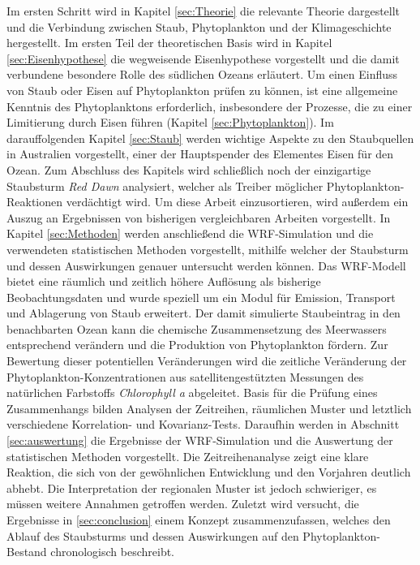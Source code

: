 \documentclass[12pt,a4paper,onecolumn,headheight=30pt]{scrartcl}
\begin{document}
Im ersten Schritt wird in Kapitel \ref{sec:Theorie} die relevante Theorie dargestellt und die Verbindung zwischen Staub, Phytoplankton und der Klimageschichte hergestellt. Im ersten Teil der theoretischen Basis wird in Kapitel \ref{sec:Eisenhypothese} die wegweisende Eisenhypothese \citep{Martin.1990} vorgestellt und die damit verbundene besondere Rolle des südlichen Ozeans erläutert. Um einen Einfluss von Staub oder Eisen auf Phytoplankton prüfen zu können, ist eine allgemeine Kenntnis des Phytoplanktons erforderlich, insbesondere der Prozesse, die zu einer Limitierung durch Eisen führen (Kapitel \ref{sec:Phytoplankton}). Im darauffolgenden Kapitel \ref{sec:Staub} werden wichtige Aspekte zu den Staubquellen in Australien vorgestellt, einer der Hauptspender des Elementes Eisen für den Ozean. Zum Abschluss des Kapitels wird schließlich noch der einzigartige Staubsturm \textit{Red Dawn} analysiert, welcher als Treiber möglicher Phytoplankton-Reaktionen verdächtigt wird. Um diese Arbeit einzusortieren, wird außerdem ein Auszug an Ergebnissen von bisherigen vergleichbaren Arbeiten vorgestellt. In Kapitel \ref{sec:Methoden} werden anschließend die WRF-Simulation und die verwendeten statistischen Methoden vorgestellt, mithilfe welcher der Staubsturm und dessen Auswirkungen genauer untersucht werden können. Das WRF-Modell bietet eine räumlich und zeitlich höhere Auflösung als bisherige Beobachtungsdaten und wurde speziell um ein Modul für Emission, Transport und Ablagerung von Staub erweitert. Der damit simulierte Staubeintrag in den benachbarten Ozean kann die chemische Zusammensetzung des Meerwassers entsprechend verändern und die Produktion von Phytoplankton fördern. Zur Bewertung dieser potentiellen Veränderungen wird die zeitliche Veränderung der Phytoplankton-Konzentrationen aus satellitengestützten Messungen des natürlichen Farbstoffs \textit{Chlorophyll a} abgeleitet. Basis für die Prüfung eines Zusammenhangs bilden Analysen der Zeitreihen, räumlichen Muster und letztlich verschiedene Korrelation- und Kovarianz-Tests. Daraufhin werden in Abschnitt \ref{sec:auswertung} die Ergebnisse der WRF-Simulation und die Auswertung der statistischen Methoden vorgestellt. Die Zeitreihenanalyse zeigt eine klare Reaktion, die sich von der gewöhnlichen Entwicklung und den Vorjahren deutlich abhebt. Die Interpretation der regionalen Muster ist jedoch schwieriger, es müssen weitere Annahmen getroffen werden. Zuletzt wird versucht, die Ergebnisse in \ref{sec:conclusion} einem Konzept zusammenzufassen, welches den Ablauf des Staubsturms und dessen Auswirkungen auf den Phytoplankton-Bestand chronologisch beschreibt.
\end{document}
